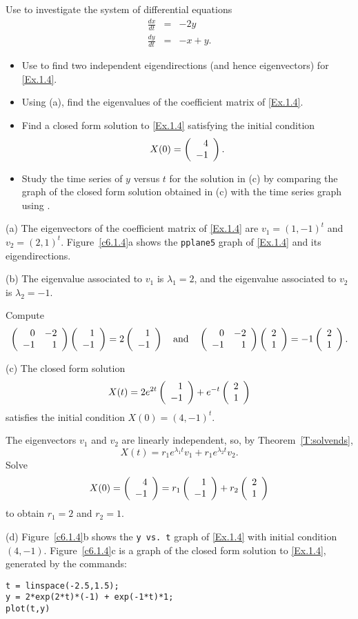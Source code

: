 \documentclass{ximera}
\begin{document}
\begin{computerExercise} \label{c6.1.4}
Use {\pplane} to investigate the system
of differential equations
\begin{equation}  \label{Ex.1.4}
\begin{array}{rcr}
\frac{dx}{dt}  & = & -2y \\
\frac{dy}{dt}  & = &  -x+y.
\end{array}
\end{equation}
\begin{itemize}
\item[(a)] Use {\pplane} to find two independent eigendirections (and
hence eigenvectors) for \eqref{Ex.1.4}.
\item[(b)] Using (a), find the eigenvalues of the coefficient matrix of
\eqref{Ex.1.4}.
\item[(c)] Find a closed form solution to \eqref{Ex.1.4} satisfying the initial
condition
\[
X(0) = \left(\begin{array}{r} 4 \\ -1\end{array}\right).
\]
\item[(d)] Study the time series of $y$ versus $t$ for the solution in (c)
by comparing the graph of the closed form solution obtained in (c) with the
time series graph using {\pplane}.
\end{itemize}

\begin{solution}

(a) The eigenvectors of the coefficient matrix of \eqref{Ex.1.4} are
$v_1 = (1,-1)^t$ and $v_2 = (2,1)^t$.  Figure~\ref{c6.1.4}a shows
the {\tt pplane5} graph of \eqref{Ex.1.4} and its eigendirections.

(b) \ans The eigenvalue associated to $v_1$ is $\lambda_1 = 2$, and
the eigenvalue associated to $v_2$ is $\lambda_2 = -1$. 

\soln Compute
\[ \left(\begin{array}{rr} 0 & -2\\ -1 &1\end{array}\right)\left(\begin{array}{r} 1 \\ -1\end{array}\right) = 2\left(\begin{array}{r} 1 \\ -1\end{array}\right) \quad\mbox{and}\quad
\left(\begin{array}{rr} 0 & -2\\ -1 &1\end{array}\right)\left(\begin{array}{r} 2 \\ 1\end{array}\right) =  -1\left(\begin{array}{r} 2 \\ 1\end{array}\right). \]

(c) \ans The closed form solution
\[
X(t) = 2e^{2t}\left(\begin{array}{r} 1 \\ -1\end{array}\right) + e^{-t}\left(\begin{array}{r} 2 \\ 1\end{array}\right)
\]
satisfies the initial condition $X(0) = (4,-1)^t$.

\soln The eigenvectors $v_1$ and $v_2$ are linearly independent, so, by 
Theorem~\ref{T:solvends},
\[
X(t) = r_1e^{\lambda_1t}v_1 + r_1e^{\lambda_2t}v_2.
\]
Solve
\[
X(0) = \left(\begin{array}{r} 4 \\ -1\end{array}\right) = r_1\left(\begin{array}{r} 1 \\ -1\end{array}\right) + r_2\left(\begin{array}{r} 2 \\ 1\end{array}\right)
\]
to obtain $r_1 = 2$ and $r_2 = 1$.

(d) Figure~\ref{c6.1.4}b shows the {\tt y vs.\ t} graph of \eqref{Ex.1.4}
with initial condition $(4,-1)$.  Figure~\ref{c6.1.4}c is a graph of 
the closed form solution to \eqref{Ex.1.4}, generated by the \Matlab
commands:
\begin{verbatim}
t = linspace(-2.5,1.5);
y = 2*exp(2*t)*(-1) + exp(-1*t)*1;
plot(t,y)
\end{verbatim}


\end{solution}
\end{computerExercise}
\end{document}
